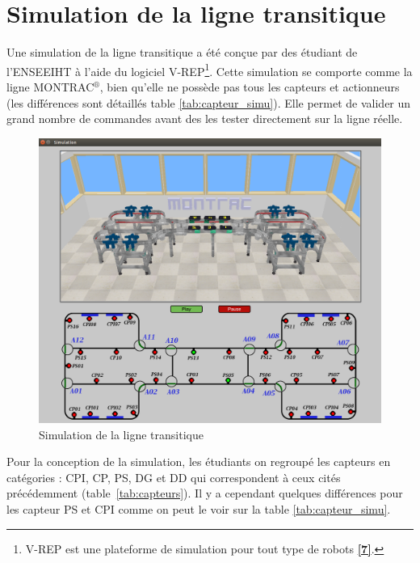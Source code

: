 \documentclass[a4paper,french, titlepage]{book}
\begin{document}
\section{Simulation de la ligne transitique} 

Une simulation de la ligne transitique a été conçue par des étudiant de l'ENSEEIHT à l'aide du logiciel V-REP\footnote{V-REP est une plateforme de simulation pour tout type de robots \hyperref[biblio]{\textbf{[7]}}.}. Cette simulation se comporte comme la ligne MONTRAC$^{\circledR}$, bien qu'elle ne possède pas tous les capteurs et actionneurs (les différences sont détaillés table \ref{tab:capteur_simu}). Elle permet de valider un grand nombre de commandes avant des les tester directement sur la ligne réelle.

\begin{figure}[H]
	     \begin{center}
	     \includegraphics[scale=0.5]{Images/simulation2.png} 
	     \end{center}
	     \caption{Simulation de la ligne transitique}
	     \label{Simulation}
\end{figure}

Pour la conception de la simulation, les étudiants on regroupé les capteurs en catégories : CPI, CP, PS, DG et DD qui correspondent à ceux cités précédemment (table~\ref{tab:capteurs}). Il y a cependant quelques différences pour les capteur PS et CPI comme on peut le voir sur la table \ref{tab:capteur_simu}.
\end{document}
